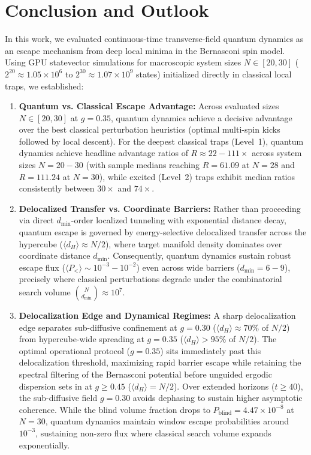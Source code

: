 \documentclass[10pt,twocolumn,a4paper]{article}
\begin{document}
\section{Conclusion and Outlook}
\label{sec:conclusion}
In this work, we evaluated continuous-time transverse-field quantum dynamics as an escape mechanism from deep local minima in the Bernasconi spin model. Using GPU statevector simulations for macroscopic system sizes $N \in [20, 30]$ ($2^{20} \approx 1.05 \times 10^6$ to $2^{30} \approx 1.07 \times 10^9$ states) initialized directly in classical local traps, we established:
\begin{enumerate}
    \item \textbf{Quantum vs. Classical Escape Advantage:} Across evaluated sizes $N \in [20, 30]$ at $g = 0.35$, quantum dynamics achieve a decisive advantage over the best classical perturbation heuristics (optimal multi-spin kicks followed by local descent). For the deepest classical traps (Level~1), quantum dynamics achieve headline advantage ratios of $R \approx 22 - 111\times$ across system sizes $N = 20 - 30$ (with sample medians reaching $R = 61.09$ at $N = 28$ and $R = 111.24$ at $N = 30$), while excited (Level~2) traps exhibit median ratios consistently between $30\times$ and $74\times$.
    \item \textbf{Delocalized Transfer vs. Coordinate Barriers:} Rather than proceeding via direct $d_{\min}$-order localized tunneling with exponential distance decay, quantum escape is governed by energy-selective delocalized transfer across the hypercube ($\langle d_H \rangle \approx N/2$), where target manifold density dominates over coordinate distance $d_{\min}$. Consequently, quantum dynamics sustain robust escape flux ($\langle P_< \rangle \sim 10^{-3} - 10^{-2}$) even across wide barriers ($d_{\min} = 6 - 9$), precisely where classical perturbations degrade under the combinatorial search volume $\binom{N}{d_{\min}} \approx 10^7$.
    \item \textbf{Delocalization Edge and Dynamical Regimes:} A sharp delocalization edge separates sub-diffusive confinement at $g = 0.30$ ($\langle d_H \rangle \approx 70\%$ of $N/2$) from hypercube-wide spreading at $g = 0.35$ ($\langle d_H \rangle > 95\%$ of $N/2$). The optimal operational protocol ($g = 0.35$) sits immediately past this delocalization threshold, maximizing rapid barrier escape while retaining the spectral filtering of the Bernasconi potential before unguided ergodic dispersion sets in at $g \ge 0.45$ ($\langle d_H \rangle = N/2$). Over extended horizons ($t \ge 40$), the sub-diffusive field $g = 0.30$ avoids dephasing to sustain higher asymptotic coherence. While the blind volume fraction drops to $P_{\mathrm{blind}} = 4.47 \times 10^{-8}$ at $N = 30$, quantum dynamics maintain window escape probabilities around $10^{-3}$, sustaining non-zero flux where classical search volume expands exponentially.
\end{enumerate}
\end{document}
